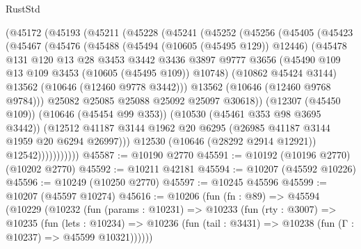 \begin{lexlean}{RustStd}
\begin{coremodule}
          (@45172
            (@45193
              (@45211
                (@45228
                  (@45241
                    (@45252
                      (@45256
                        (@45405
                          (@45423
                            (@45467
                              (@45476
                                (@45488
                                  (@45494 (@10605 (@45495 @129)) @12446)
                                  (@45478
                                    @131
                                    @120
                                    @13
                                    @28
                                    @3453
                                    @3442
                                    @3436
                                    @3897
                                    @9777
                                    @3656
                                    (@45490 @109 @13 @109 @3453 (@10605 (@45495 @109)) @10748)
                                    (@10862 @45424 @3144)
                                    @13562
                                    (@10646 (@12460 @9778 @3442)))
                                  @13562
                                  (@10646 (@12460 @9768 @9784)))
                                @25082
                                @25085
                                @25088
                                @25092
                                @25097
                                @30618))
                            (@12307 (@45450 @109))
                            (@10646 (@45454 @99 @353))
                            (@10530 (@45461 @353 @98 @3695 @3442))
                            (@12512
                              @41187
                              @3144
                              @1962
                              @20
                              @6295
                              (@26985 @41187 @3144 @1959 @20 @6294 @26997)))
                          @12530
                          (@10646 (@28292 @2914 @12921))
                          @12542)))))))))))
@45587 := @10190 @2770
@45591 := @10192 (@10196 @2770) (@10202 @2770)
@45592 := @10211 @42181
@45594 := @10207 (@45592 @10226)
@45596 := @10249 (@10250 @2770)
@45597 := @10245 @45596
@45599 := @10207 (@45597 @10274)
@45616 := @10206
    (fun (fn : @89) =>
    @45594
      (@10229
        (@10232
          (fun (params : @10231) =>
          @10233
            (fun (rty : @3007) =>
            @10235
              (fun (lets : @10234) =>
              @10236 (fun (tail : @3431) => @10238 (fun (Γ : @10237) => @45599 @10321))))))

\end{coremodule}
\end{lexlean}
